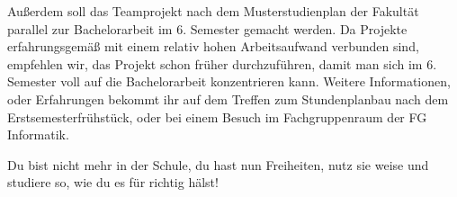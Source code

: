 Außerdem soll das Teamprojekt nach dem Musterstudienplan der Fakultät parallel zur Bachelorarbeit im 6. Semester gemacht werden. Da Projekte erfahrungsgemäß mit einem relativ hohen Arbeitsaufwand verbunden sind, empfehlen wir, das Projekt schon früher durchzuführen, damit man sich im 6. Semester voll auf die Bachelorarbeit konzentrieren kann. Weitere Informationen, oder Erfahrungen bekommt ihr auf dem Treffen zum Stundenplanbau nach dem Erstsemesterfrühstück, oder bei einem Besuch im Fachgruppenraum der FG Informatik.



Du bist nicht mehr in der Schule, du hast nun Freiheiten, nutz sie weise und studiere so, wie du es für richtig hälst!

